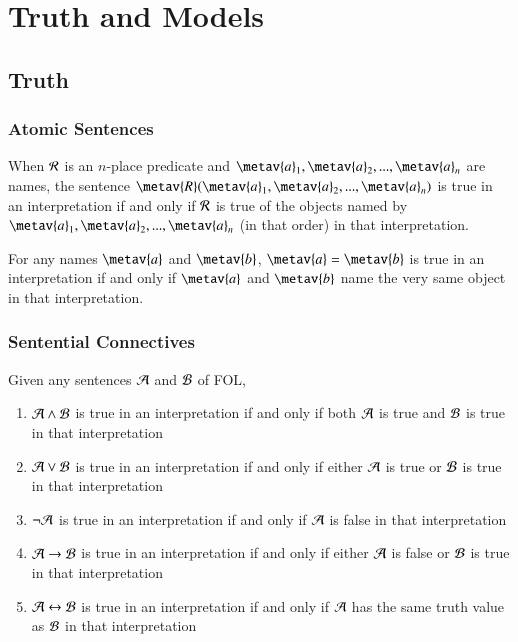 \documentclass[12pt, a4paper, oneside, openright, titlepage]{book}
\begin{document}
\begin{rmk}
\begin{tikzpicture}[x=0.75pt,y=0.75pt,yscale=-1,xscale=1]
\end{tikzpicture}
\end{rmk}



\chapter{\textsection\textsection Truth and Models}


\section{\textsection Truth}

\subsection{\textsection Atomic Sentences}

\begin{defn}
    When $\metav{R}$ is an $n$-place predicate and $\metav{a}_1,\metav{a}_2,...,\metav{a}_n$ are names, the sentence $\metav{R}(\metav{a}_1,\metav{a}_2,...,\metav{a}_n)$ is true in an interpretation if and only if $\metav{R}$ is true of the objects named by $\metav{a}_1,\metav{a}_2,...,\metav{a}_n$ (in that order) in that interpretation.
\end{defn}


\begin{defn}
    For any names $\metav{a}$ and $\metav{b}$, $\metav{a} = \metav{b}$ is true in an interpretation if and only if $\metav{a}$ and $\metav{b}$ name the very same object in that interpretation.
\end{defn}

\subsection{\textsection Sentential Connectives}

\begin{defn}
    Given any sentences $\metav{A}$ and $\metav{B}$ of FOL, \begin{enumerate}
        \item $\metav{A}\eand \metav{B}$ is true in an interpretation if and only if both $\metav{A}$ is true and $\metav{B}$ is true in that interpretation
        \item $\metav{A}\eor \metav{B}$ is true in an interpretation if and only if either $\metav{A}$ is true or $\metav{B}$ is true in that interpretation
        \item $\enot \metav{A}$ is true in an interpretation if and only if $\metav{A}$ is false in that interpretation
        \item $\metav{A}\eif \metav{B}$ is true in an interpretation if and only if either $\metav{A}$ is false or $\metav{B}$ is true in that interpretation
        \item $\metav{A}\eiff \metav{B}$ is true in an interpretation if and only if $\metav{A}$ has the same truth value as $\metav{B}$ in that interpretation
    \end{enumerate}
\end{defn}
\end{document}
